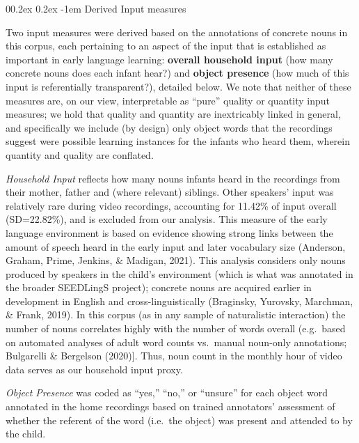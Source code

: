\documentclass[
  english,
  man,floatsintext]{apa6}
\makeatletter
\let\oldparagraph\paragraph
\renewcommand{\paragraph}[1]{\oldparagraph{#1}\mbox{}}
\renewcommand{\paragraph}{\@startsection{paragraph}{4}{\parindent}%
  {0\baselineskip \@plus 0.2ex \@minus 0.2ex}%
  {-1em}%
  {\normalfont\normalsize\bfseries\itshape\typesectitle}}
\makeatother
\begin{document}
\hypertarget{derived-input-measures}{%
\paragraph{Derived Input measures}\label{derived-input-measures}}

Two input measures were derived based on the annotations of concrete nouns in this corpus, each pertaining to an aspect of the input that is established as important in early language learning: \textbf{overall household input} (how many concrete nouns does each infant hear?) and \textbf{object presence} (how much of this input is referentially transparent?), detailed below. We note that neither of these measures are, on our view, interpretable as ``pure'' quality or quantity input measures; we hold that quality and quantity are inextricably linked in general, and specifically we include (by design) only object words that the recordings suggest were possible learning instances for the infants who heard them, wherein quantity and quality are conflated.

\emph{Household Input} reflects how many nouns infants heard in the recordings from their mother, father and (where relevant) siblings. Other speakers' input was relatively rare during video recordings, accounting for 11.42\% of input overall (SD=22.82\%), and is excluded from our analysis. This measure of the early language environment is based on evidence showing strong links between the amount of speech heard in the early input and later vocabulary size (Anderson, Graham, Prime, Jenkins, \& Madigan, 2021). This analysis considers only nouns produced by speakers in the child's environment (which is what was annotated in the broader SEEDLingS project); concrete nouns are acquired earlier in development in English and cross-linguistically (Braginsky, Yurovsky, Marchman, \& Frank, 2019). In this corpus (as in any sample of naturalistic interaction) the number of nouns correlates highly with the number of words overall (e.g.~based on automated analyses of adult word counts vs.~manual noun-only annotations; Bulgarelli \& Bergelson (2020){]}. Thus, noun count in the monthly hour of video data serves as our household input proxy.

\emph{Object Presence} was coded as ``yes,'' ``no,'' or ``unsure'' for each object word annotated in the home recordings based on trained annotators' assessment of whether the referent of the word (i.e.~the object) was present and attended to by the child.
\end{document}
